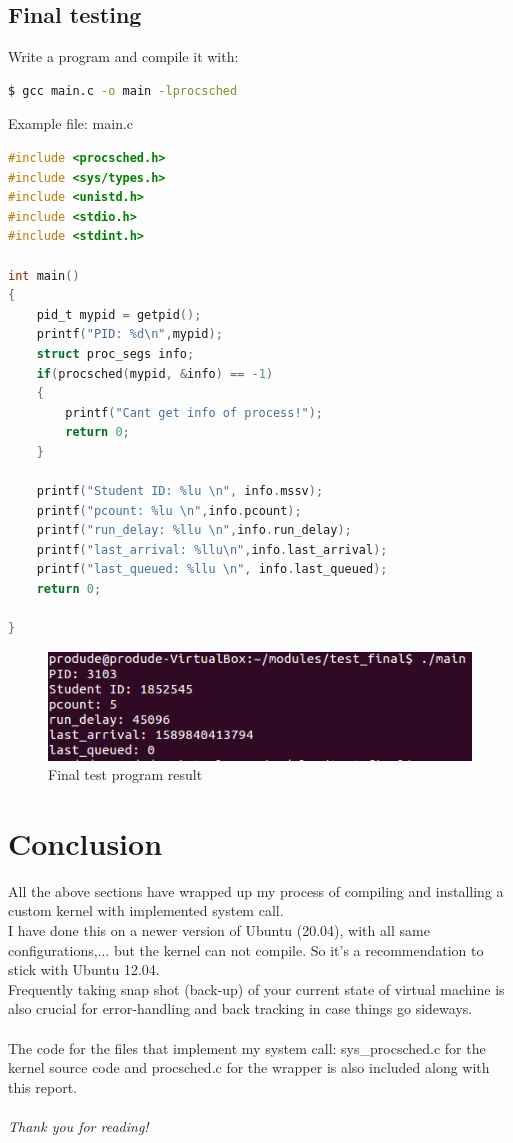 \documentclass[a4paper]{article}
\begin{document}
\subsection{Final testing}
Write a program and compile it with:
\begin{lstlisting}[language=bash]
$ gcc main.c -o main -lprocsched
\end{lstlisting}
Example file: main.c
\begin{lstlisting}[language=c]
#include <procsched.h>
#include <sys/types.h>
#include <unistd.h>
#include <stdio.h>
#include <stdint.h>

int main()
{
	pid_t mypid = getpid();
	printf("PID: %d\n",mypid);
	struct proc_segs info;
	if(procsched(mypid, &info) == -1)
	{
		printf("Cant get info of process!");
		return 0;
	}
	
	printf("Student ID: %lu \n", info.mssv);
	printf("pcount: %lu \n",info.pcount);
	printf("run_delay: %llu \n",info.run_delay);
	printf("last_arrival: %llu\n",info.last_arrival);
	printf("last_queued: %llu \n", info.last_queued);
	return 0;

}
\end{lstlisting}
\begin{center}
    \begin{figure}[H]
    \begin{center}
     \includegraphics[scale=1]{finalTest.png}
    \end{center}
    \caption{Final test program result}
    \end{figure}
\end{center}
\section{Conclusion}
All the above sections have wrapped up my process of compiling and installing a custom kernel with implemented system call.\\
I have done this on a newer version of Ubuntu (20.04), with all same configurations,... but the kernel can not compile. So it's a recommendation to stick with Ubuntu 12.04.\\
Frequently taking snap shot (back-up) of your current state of virtual machine is also crucial for error-handling and back tracking in case things go sideways.\\\\
The code for the files that implement my system call: sys\_procsched.c for the kernel source code and procsched.c for the wrapper is also included along with this report.\\\\
\emph{Thank you for reading!}
\end{document}
